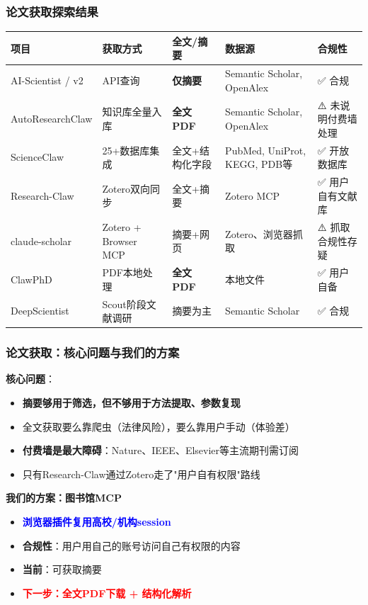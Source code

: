 \documentclass[
  aspectratio=169,
  presentation,
  titlegraphic=./images/bit_logo.pdf,
  framelogo=./images/bit_logo.pdf
]{bitbeamer}
\begin{document}
\begin{frame}[t]
  \frametitle{论文获取探索结果}

  \begin{table}
    \centering
    \scriptsize
    \begin{tabular}{p{2.5cm}p{2cm}p{1.8cm}p{3.5cm}p{1.5cm}}
      \toprule
      \textbf{项目} & \textbf{获取方式} & \textbf{全文/摘要} & \textbf{数据源} & \textbf{合规性} \\
      \midrule
      AI-Scientist / v2 & API查询 & \textbf{仅摘要} & Semantic Scholar, OpenAlex & ✅ 合规 \\
      \midrule
      AutoResearchClaw & 知识库全量入库 & \textbf{全文PDF} & Semantic Scholar, OpenAlex & ⚠️ 未说明付费墙处理 \\
      \midrule
      ScienceClaw & 25+数据库集成 & 全文+结构化字段 & PubMed, UniProt, KEGG, PDB等 & ✅ 开放数据库 \\
      \midrule
      Research-Claw & Zotero双向同步 & 全文+摘要 & Zotero MCP & ✅ 用户自有文献库 \\
      \midrule
      claude-scholar & Zotero + Browser MCP & 摘要+网页 & Zotero、浏览器抓取 & ⚠️ 抓取合规性存疑 \\
      \midrule
      ClawPhD & PDF本地处理 & \textbf{全文PDF} & 本地文件 & ✅ 用户自备 \\
      \midrule
      DeepScientist & Scout阶段文献调研 & 摘要为主 & Semantic Scholar & ✅ 合规 \\
      \bottomrule
    \end{tabular}
  \end{table}

\end{frame}

\begin{frame}[t]
  \frametitle{论文获取：核心问题与我们的方案}

  \textbf{核心问题}：
  \begin{itemize}
    \item \textbf{摘要够用于筛选，但不够用于方法提取、参数复现}
    \item 全文获取要么靠爬虫（法律风险），要么靠用户手动（体验差）
    \item \textbf{付费墙是最大障碍}：Nature、IEEE、Elsevier等主流期刊需订阅
    \item 只有Research-Claw通过Zotero走了"用户自有权限"路线
  \end{itemize}

  \vspace{0.5cm}

  \textbf{我们的方案：图书馆MCP}
  \begin{itemize}
    \item \textcolor{blue}{\textbf{浏览器插件复用高校/机构session}}
    \item \textbf{合规性}：用户用自己的账号访问自己有权限的内容
    \item \textbf{当前}：可获取摘要
    \item \textcolor{red}{\textbf{下一步：全文PDF下载 + 结构化解析}}
  \end{itemize}

\end{frame}
\end{document}
